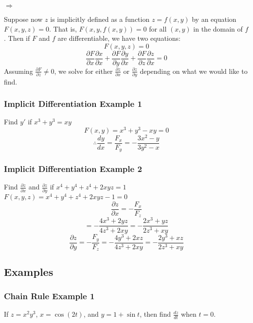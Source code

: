 \documentclass[12pt]{article}
\begin{document}
\(\Rightarrow\) 
\indent \fbox{
	\begin{minipage}{1.5in}
		\[
			\frac{dy}{dx} = \frac{-\frac{\partial F}{\partial x} }{\frac{\partial F}{\partial y} } = -\frac{F_x}{F_y}
		\]
	\end{minipage}
}

Suppose now \(z\) is implicitly defined as a function \(z=f(x,y)\) by an equation \(F(x,y,z) = 0\). That is, \(F(x, y, f(x,y)) = 0\) for all \((x,y)\) in the domain of \(f\). Then if \(F\) and \(f\) are differentiable, we have two equations:
\[
	F(x,y,z) = 0
\]
\[
	\frac{\partial F}{\partial x} \frac{\partial x}{\partial x} + \frac{\partial F}{\partial y} \frac{\partial y}{\partial x} + \frac{\partial F}{\partial z} \frac{\partial z}{\partial x} = 0
\]
Assuming \(\frac{\partial F}{\partial z} \neq 0\), we solve for either \(\frac{\partial z}{\partial x}\)  or \(\frac{\partial z}{\partial y}\) depending on what we would like to find.

\fbox{
	\begin{minipage}{2in}
		\[
			\frac{\partial z}{\partial x} -\frac{\frac{\partial F}{\partial x} }{\frac{\partial F}{\partial z} } \qquad  \frac{\partial z}{\partial y} = -\frac{\frac{\partial F}{\partial y} }{\frac{\partial F}{\partial z} }
		\]
	\end{minipage}
}
\subsubsection{Implicit Differentiation Example 1}
Find \(y'\) if \(x^3 + y^3 = xy\)
\[
	F(x,y) = x^3 + y^3 - xy  = 0
\]
\[
	\therefore \frac{dy}{dx} = \frac{F_x}{F_y} = -\frac{3x^2 - y}{3y^2 - x}
\]

\subsubsection{Implicit Differentiation Example 2}
Find \(\frac{\partial z}{\partial x} \) and \(\frac{\partial z}{\partial y} \) if \(x^4 + y^4 + z^4 + 2xyz = 1\)\\
\(F(x,y,z) = x^4 + y^4 + z^4 + 2xyz -1 = 0\)
\[
	\frac{\partial z}{\partial x}  = -\frac{F_x}{F_z}
\]
\[
 	= -\frac{4x^3 + 2yz}{4z^3 + 2xy} = -\frac{2x^3 + yz}{2z^3 + xy}
\]
\[
	\frac{\partial z}{\partial y}  = -\frac{F_y}{F_z} = -\frac{4y^3 + 2xz}{4z^3 + 2xy} = -\frac{2y^3 + xz}{2z^3 + xy}
\]
\subsection{Examples}
\subsubsection{Chain Rule Example 1}
If \(z=x^2y^3\), \(x=\cos(2t)\), and \(y=1+\sin t\), then find \(\frac{dz}{dt}\) when \(t=0\).
\end{document}
